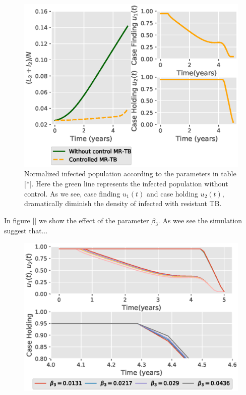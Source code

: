 \begin{figure}
  \centering
  \includegraphics{Figures/figure_1_two_strain_tbm}
  \caption{Normalized infected population according to the parameters in 
  table [*]. Here the green line represents the infected population without 
  control. As we see, case finding $u_1(t)$ and case holding $u_2(t)$, 
  dramatically diminish the density of infected with resistant TB.}
  \label{fig:figure1twostraintbm}
\end{figure}


In figure [] we show the effect of the parameter $\beta_3$. As wee see the 
simulation suggest that...

\begin{figure}
  \centering
  \includegraphics{Figures/figure_2_two_strain_tbm}
  \caption{}
  \label{fig:figure2twostraintbm}
\end{figure}

